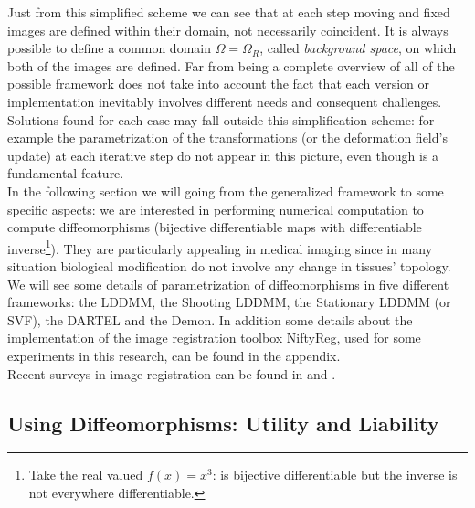 \noindent
Just from this simplified scheme we can see that at each step moving and fixed images are defined within their domain, not necessarily coincident. 
It is always possible to define a common domain $\Omega = \Omega_{R}$, called  \emph{background space}, on which both of the images are defined.
%
\noindent
Far from being a complete overview of all of the possible framework does not take into account the fact that each version or implementation inevitably involves different needs and consequent challenges. Solutions found for each case may fall outside this simplification scheme: for example the parametrization of the transformations (or the deformation field's update) at each iterative step do not appear in this picture, even though is a fundamental feature. \\
In the following section we will going from the generalized framework to some specific aspects: we are interested in performing numerical computation to compute diffeomorphisms (bijective differentiable maps with differentiable inverse\footnote{Take the real valued $f(x)=x^3$: is bijective differentiable but the inverse is not everywhere differentiable.}). They are particularly appealing in medical imaging since in many situation biological modification do not involve any change in tissues' topology. We will see some details of parametrization of diffeomorphisms in five different frameworks: the LDDMM, the Shooting LDDMM, the Stationary LDDMM (or SVF), the DARTEL and the Demon.  In addition some details about the implementation of the image registration toolbox NiftyReg, used for some experiments in this research, can be found in the appendix.\\
Recent surveys in image registration can be found in \cite{Sotiras:survey:13} and \cite{Hill:survey:01}.

\subsection{Using Diffeomorphisms: Utility and Liability}

